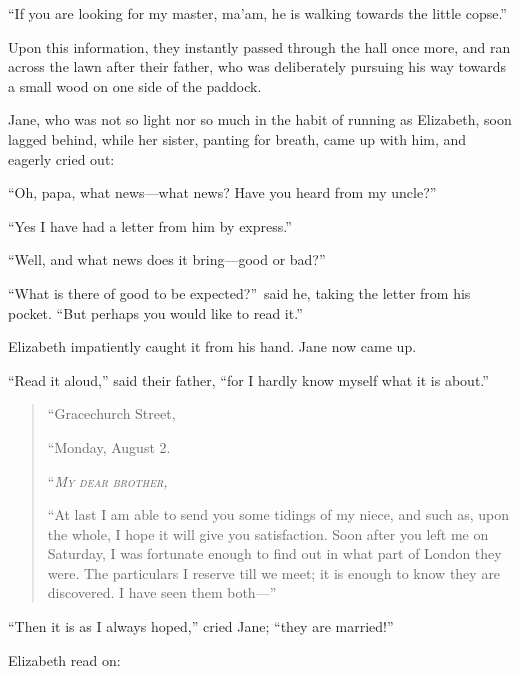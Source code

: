 \documentclass[12pt,english,oneside]{book}
\newcommand{\noun}[1]{\textsc{#1}}
\begin{document}
{}``If you are looking for my master, ma'am, he is walking towards
the little copse.''

Upon this information, they instantly passed through the hall once
more, and ran across the lawn after their father, who was deliberately
pursuing his way towards a small wood on one side of the paddock.

Jane, who was not so light nor so much in the habit of running as
Elizabeth, soon lagged behind, while her sister, panting for breath,
came up with him, and eagerly cried out:

{}``Oh, papa, what news\mbox{---}what news? Have you heard from
my uncle?''\ 

{}``Yes I have had a letter from him by express.''

{}``Well, and what news does it bring\mbox{---}good or bad?''\ 

{}``What is there of good to be expected?''\ said he, taking the
letter from his pocket. {}``But perhaps you would like to read it.''

Elizabeth impatiently caught it from his hand. Jane now came up.

{}``Read it aloud,'' said their father, {}``for I hardly know myself
what it is about.''

\begin{quotation}
``Gracechurch Street,\nopagebreak[4]

``Monday, August 2.\nopagebreak[4]

\noindent {}``\textit{\emph{\noun{My}}} \textit{\emph{\noun{dear}}}
\textit{\emph{\noun{brother}}}\emph{\noun{,}}\nopagebreak[4]

{}``At last I am able to send you some tidings of my niece, and such
as, upon the whole, I hope it will give you satisfaction. Soon after
you left me on Saturday, I was fortunate enough to find out in what
part of London they were. The particulars I reserve till we meet;
it is enough to know they are discovered. I have seen them both\mbox{---}'' 
\end{quotation}
\hspace{0.25in}{}``Then it is as I always hoped,'' cried Jane;
{}``they are married!''\ 

Elizabeth read on:
\end{document}
